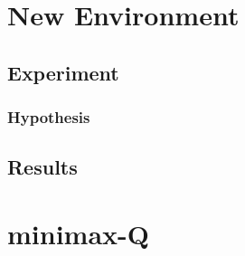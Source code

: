 \documentclass[a4paper,10pt]{article}
\begin{document}
\section{New Environment}


\subsection{Experiment}



\subsubsection{Hypothesis}


\subsection{Results}









\section{minimax-Q}
\end{document}
